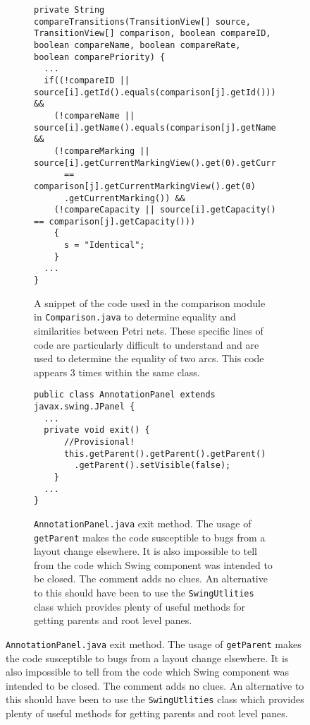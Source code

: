 \begin{figure}[b]
\begin{center}
  \begin{subfigure}[b]{\linewidth}
    \begin{lstlisting}[frame=single]
private String compareTransitions(TransitionView[] source, TransitionView[] comparison, boolean compareID, boolean compareName, boolean compareRate,  boolean comparePriority) {
  ...
  if((!compareID || source[i].getId().equals(comparison[j].getId())) &&
    (!compareName || source[i].getName().equals(comparison[j].getName())) &&
    (!compareMarking || source[i].getCurrentMarkingView().get(0).getCurrentMarking()
      == comparison[j].getCurrentMarkingView().get(0)
      .getCurrentMarking()) &&
    (!compareCapacity || source[i].getCapacity() == comparison[j].getCapacity()))
    {
      s = "Identical";
    }
  ...
}
    \end{lstlisting}
    \caption{A snippet of the code used in the comparison module in 
            \texttt{Comparison.java} to determine equality and similarities between
            Petri nets. These specific lines of code are particularly difficult to understand and are used to determine the equality of two arcs. This code appears 3 times within the same class.}
  \end{subfigure}


\begin{subfigure}[b]{\linewidth}
    \vspace{0.5cm}
    \begin{lstlisting}[frame=single]
public class AnnotationPanel extends javax.swing.JPanel {
  ...
  private void exit() {
      //Provisional!
      this.getParent().getParent().getParent()
        .getParent().setVisible(false);
    }
  ...
}
    \end{lstlisting}
  \caption{\texttt{AnnotationPanel.java} exit method. The usage of \texttt{getParent} makes the code susceptible to bugs from a layout change elsewhere. It is 
  also impossible to tell from the code which Swing component was intended to be closed. The comment adds no clues. An alternative to this should have been to use the \texttt{SwingUtlities} class which provides plenty of useful methods for getting parents and root level panes.}
  \end{subfigure}
  
\end{center}
\end{figure}


